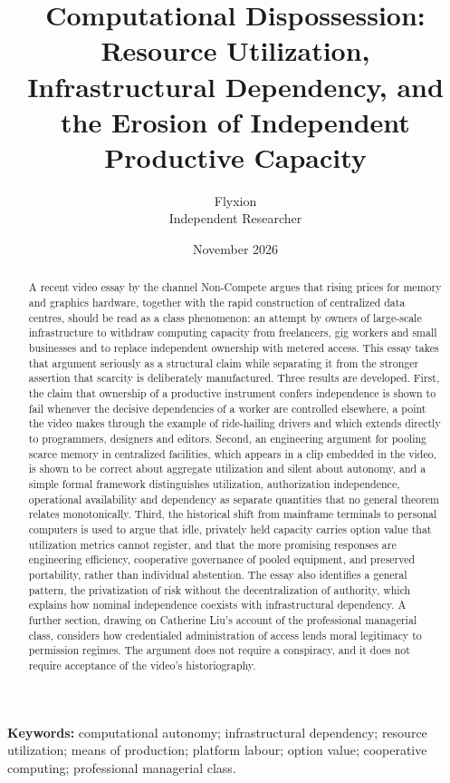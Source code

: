 \documentclass[11pt]{article}
\title{Computational Dispossession: Resource Utilization, Infrastructural Dependency, and the Erosion of Independent Productive Capacity}
\author{Flyxion\\Independent Researcher}
\date{November 2026}
\theoremstyle{plain}
\theoremstyle{definition}
\begin{document}
\maketitle

\begin{abstract}
\noindent A recent video essay by the channel Non-Compete argues that rising prices for memory and graphics hardware, together with the rapid construction of centralized data centres, should be read as a class phenomenon: an attempt by owners of large-scale infrastructure to withdraw computing capacity from freelancers, gig workers and small businesses and to replace independent ownership with metered access. This essay takes that argument seriously as a structural claim while separating it from the stronger assertion that scarcity is deliberately manufactured. Three results are developed. First, the claim that ownership of a productive instrument confers independence is shown to fail whenever the decisive dependencies of a worker are controlled elsewhere, a point the video makes through the example of ride-hailing drivers and which extends directly to programmers, designers and editors. Second, an engineering argument for pooling scarce memory in centralized facilities, which appears in a clip embedded in the video, is shown to be correct about aggregate utilization and silent about autonomy, and a simple formal framework distinguishes utilization, authorization independence, operational availability and dependency as separate quantities that no general theorem relates monotonically. Third, the historical shift from mainframe terminals to personal computers is used to argue that idle, privately held capacity carries option value that utilization metrics cannot register, and that the more promising responses are engineering efficiency, cooperative governance of pooled equipment, and preserved portability, rather than individual abstention. The essay also identifies a general pattern, the privatization of risk without the decentralization of authority, which explains how nominal independence coexists with infrastructural dependency. A further section, drawing on Catherine Liu's account of the professional managerial class, considers how credentialed administration of access lends moral legitimacy to permission regimes. The argument does not require a conspiracy, and it does not require acceptance of the video's historiography.
\end{abstract}

\vspace{1.5em}
\noindent\textbf{Keywords:} computational autonomy; infrastructural dependency; resource utilization; means of production; platform labour; option value; cooperative computing; professional managerial class.
\end{document}
